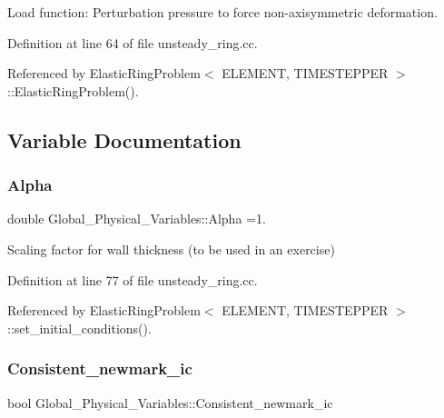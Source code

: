 Load function\+: Perturbation pressure to force non-\/axisymmetric deformation. 



Definition at line 64 of file unsteady\+\_\+ring.\+cc.



Referenced by Elastic\+Ring\+Problem$<$ E\+L\+E\+M\+E\+N\+T, T\+I\+M\+E\+S\+T\+E\+P\+P\+E\+R $>$\+::\+Elastic\+Ring\+Problem().



\subsection{Variable Documentation}
\mbox{\label{namespaceGlobal__Physical__Variables_aa2e802ee7cc8e1ac900ba94c3ce86eb7}} 
\subsubsection{\texorpdfstring{Alpha}{Alpha}}
{\footnotesize\ttfamily double Global\+\_\+\+Physical\+\_\+\+Variables\+::\+Alpha =1.}



Scaling factor for wall thickness (to be used in an exercise) 



Definition at line 77 of file unsteady\+\_\+ring.\+cc.



Referenced by Elastic\+Ring\+Problem$<$ E\+L\+E\+M\+E\+N\+T, T\+I\+M\+E\+S\+T\+E\+P\+P\+E\+R $>$\+::set\+\_\+initial\+\_\+conditions().

\mbox{\label{namespaceGlobal__Physical__Variables_affe3ddb0b7c1d7dbf3955738edbda1af}} 
\subsubsection{\texorpdfstring{Consistent\+\_\+newmark\+\_\+ic}{Consistent\_newmark\_ic}}
{\footnotesize\ttfamily bool Global\+\_\+\+Physical\+\_\+\+Variables\+::\+Consistent\+\_\+newmark\+\_\+ic}



